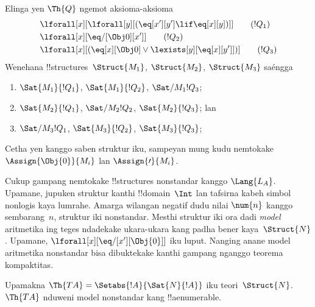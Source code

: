 \documentclass[../../../include/open-logic-section]{subfiles}
\begin{document}
\begin{prob}
Elinga yen $\Th{Q}$
ngemot aksioma-aksioma
\begin{align*}
& \lforall[x][\lforall[y][(\eq[x'][y'] \lif \eq[x][y])]] \tag{$!Q_1$}\\
& \lforall[x][\eq/[\Obj 0][x']] \tag{$!Q_2$}\\
& \lforall[x][(\eq[x][\Obj 0] \lor \lexists[y][\eq[x][y']])] \tag{$!Q_3$}
\end{align*}
Wenehana !!{structure}s~$\Struct{M_1}$,
$\Struct{M_2}$, $\Struct{M_3}$
saéngga
\begin{enumerate}
\item $\Sat{M_1}{!Q_1}$, $\Sat{M_1}{!Q_2}$, $\Sat/{M_1}{!Q_3}$;
\item $\Sat{M_2}{!Q_1}$, $\Sat/{M_2}{!Q_2}$, $\Sat{M_2}{!Q_3}$; lan
\item $\Sat/{M_3}{!Q_1}$, $\Sat{M_3}{!Q_2}$, $\Sat{M_3}{!Q_3}$;
\end{enumerate}
Cetha yen kanggo saben
struktur iku, sampeyan mung
kudu nemtokake
$\Assign{\Obj{0}}{M_i}$
lan $\Assign{\prime}{M_i}$.
\end{prob}

\begin{explain}
Cukup gampang nemtokake
!!{structure}s nonstandar
kanggo $\Lang{L_A}$.
Upamane, jupuken
struktur kanthi
!!{domain}~$\Int$
lan tafsirna kabeh
simbol nonlogis
kaya lumrahe.
Amarga wilangan negatif
dudu nilai $\num{n}$
kanggo sembarang~$n$,
struktur iki nonstandar.
Mesthi struktur iki
ora dadi \emph{model}
aritmetika ing teges
ndadekake ukara-ukara
kang padha bener
kaya~$\Struct{N}$.
Upamane,
$\lforall[x][\eq/[x'][\Obj{0}]]$
iku luput. Nanging
anane model aritmetika
nonstandar bisa dibuktekake
kanthi gampang
nganggo teorema kompaktitas.
\end{explain}

\begin{prop}
Upamakna
$\Th{TA} = \Setabs{!A}{\Sat{N}{!A}}$
iku teori~$\Struct{N}$.
$\Th{TA}$ nduweni
model nonstandar
kang !!a{enumerable}.
\end{prop}
\end{document}
